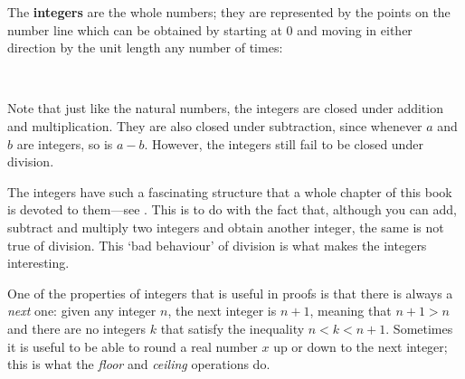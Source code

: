 \begin{definition}
\label{defIntegerInformal}
The \textbf{integers} are the whole numbers; they are represented by the points on the number line which can be obtained by starting at $0$ and moving in either direction by the unit length any number of times:
\begin{center}
\end{center}
~
\end{definition}

Note that just like the natural numbers, the integers are closed under addition and multiplication. They are also closed under subtraction, since whenever $a$ and $b$ are integers, so is $a-b$. However, the integers still fail to be closed under division.

The integers have such a fascinating structure that a whole chapter of this book is devoted to them---see . This is to do with the fact that, although you can add, subtract and multiply two integers and obtain another integer, the same is not true of division. This `bad behaviour' of division is what makes the integers interesting.

One of the properties of integers that is useful in proofs is that there is always a \textit{next} one: given any integer $n$, the next integer is $n+1$, meaning that $n+1>n$ and there are no integers $k$ that satisfy the inequality $n<k<n+1$. Sometimes it is useful to be able to round a real number $x$ up or down to the next integer; this is what the \textit{floor} and \textit{ceiling} operations do.


